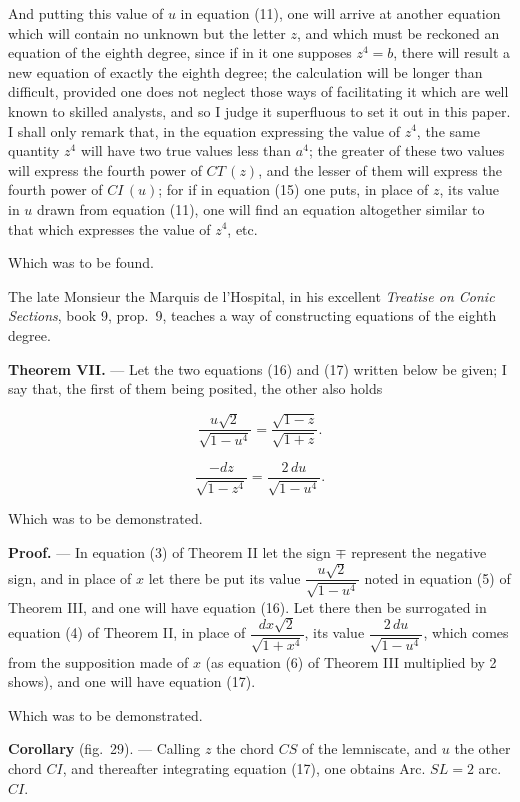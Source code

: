 \documentclass{article}
\begin{document}
And putting this value of $u$ in equation (11), one will arrive at another equation which will
contain no unknown but the letter $z$, and which must be reckoned an equation of the eighth
degree, since if in it one supposes $z^{4} = b$, there will result a new equation of exactly the
eighth degree; the calculation will be longer than difficult, provided one does not neglect
those ways of facilitating it which are well known to skilled analysts, and so I judge it
superfluous to set it out in this paper. I shall only remark that, in the equation expressing the
value of $z^{4}$, the same quantity $z^{4}$ will have two true values less than $a^{4}$; the
greater of these two values will express the fourth power of $CT\,(z)$, and the lesser of them
will express the fourth power of $CI\,(u)$; for if in equation (15) one puts, in place of $z$,
its value in $u$ drawn from equation (11), one will find an equation altogether similar to that
which expresses the value of $z^{4}$, etc.

Which was to be found.

The late Monsieur the Marquis de l'Hospital, in his excellent \emph{Treatise on Conic}
\emph{Sections}, book 9, prop.\ 9, teaches a way of constructing equations of the eighth degree.

\textbf{Theorem VII.} --- Let the two equations (16) and (17) written below be given; I say that,
the first of them being posited, the other also holds

\[ \frac{u\sqrt{2}}{\sqrt{1-u^{4}}} = \frac{\sqrt{1-z}}{\sqrt{1+z}}. \tag{16} \]

\[ \frac{-dz}{\sqrt{1-z^{4}}} = \frac{2\,du}{\sqrt{1-u^{4}}}. \tag{17} \]

Which was to be demonstrated.

\textbf{Proof.} --- In equation (3) of Theorem II let the sign $\mp$ represent the negative sign,
and in place of $x$ let there be put its value $\dfrac{u\sqrt{2}}{\sqrt{1-u^{4}}}$ noted in
equation (5) of Theorem III, and one will have equation (16). Let there then be surrogated in
equation (4) of Theorem II, in place of $\dfrac{dx\sqrt{2}}{\sqrt{1+x^{4}}}$, its value
$\dfrac{2\,du}{\sqrt{1-u^{4}}}$, which comes from the supposition made of $x$ (as equation (6) of
Theorem III multiplied by 2 shows), and one will have equation (17).

Which was to be demonstrated.

\textbf{Corollary} (fig.~29). --- Calling $z$ the chord $CS$ of the lemniscate, and $u$ the other
chord $CI$, and thereafter integrating equation (17), one obtains Arc. $SL = 2$ arc. $CI$.
\end{document}
